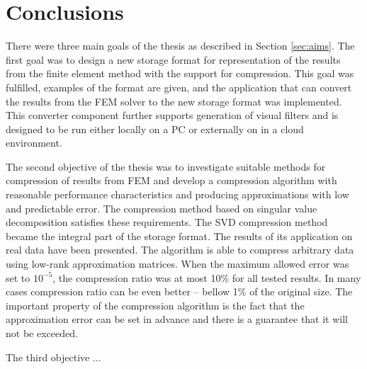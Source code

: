 \chapter{Conclusions}
\label{chapter:conclusions}


There were three main goals of the thesis as described in Section \ref{sec:aims}. The first goal was to design a new storage format for representation of the results from the finite element method with the support for compression. This goal was fulfilled, examples of the format are given, and the application that can convert the results from the FEM solver to the new storage format was implemented. This converter component further supports generation of visual filters and is designed to be run either locally on a PC or externally on in a cloud environment.

The second objective of the thesis was to investigate suitable methods for compression of results from FEM and develop a compression algorithm with reasonable performance characteristics and producing approximations with low and predictable error. The compression method based on singular value decomposition satisfies these requirements. The SVD compression method became the integral part of the storage format. The results of its application on real data have been presented. The algorithm is able to compress arbitrary data using low-rank approximation matrices. When the maximum allowed error was set to $10^{-5}$, the compression ratio was at most 10\% for all tested results. In many cases compression ratio can be even better -- bellow 1\% of the original size. The important property of the compression algorithm is the fact that the approximation error can be set in advance and there is a guarantee that it will not be exceeded.


The third objective ...




